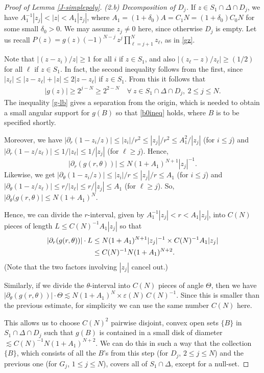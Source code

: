 \documentclass[11 pt]{amsart}
\theoremstyle{plain}
\numberwithin{equation}{section}
\theoremstyle{plain}
\numberwithin{equation}{section}
\theoremstyle{remark}
\begin{document}
\begin{proof}[Proof of Lemma \ref{J-simplepoly}]
\medskip
{\sl (2.b) Decomposition of $D_j$.}
If $z \in S_1 \cap \Delta \cap D_j$, we have $A_1^{-1} |z_j| < |z| < A_1 |z_j|$, where $A_1 = (1+\delta_0 ) A = C_1 N = (1+\delta_0 )C_0 N$ for some small $\delta_0 >0$. We may assume $z_j \not= 0$ here, since otherwise $D_j$ is empty.
Let us recall $P(z) = g(z) (-1)^{N-j}\, z^j \prod_{\ell=j+1}^N z_\ell$, as in \eqref{gz}.

Note that $|(z-z_i)/z| \ge 1$ for all $i$ if $z\in S_1$, and also $|(z_\ell - z)/z_\ell| \ge (1/2)$ for all $\ell$ if $z\in S_1$. In fact, the second inequality follows from the first, since $|z_\ell| \le |z- z_\ell| + |z| \le 2 |z- z_\ell|$ if $z \in S_1$. From this it follows that
\begin{align}\label{g-lb}
|g(z)| \ge 2^{j-N} \ge 2^{2-N} \quad \forall ~ z \in S_1 \cap \Delta \cap D_j, ~ 2\le j\le N .
\end{align}
The inequality \eqref{g-lb} gives a separation from the origin, which is needed to obtain a small angular support for $g(B)$ so that \eqref{b0ineq} holds, where $B$ is to be specified shortly.

Moreover, we have
$|\partial_r (1- z_i/z)| \le |z_i|/r^2 \le |z_j|/r^2 \le A_1^2 / |z_j|$ (for $i\le j$) and $|\partial_r (1- z/z_\ell)| \le 1/|z_\ell| \le 1/|z_j|$ (for $\ell \ge j$).
Hence,
\[ |\partial_r (g(r,\theta))| \le N(1+A_1)^{N+1} |z_j|^{-1} .
\]
Likewise, we get $|\partial_\theta (1- z_i/z)| \le |z_i|/r \le |z_j|/r \le A_1$ (for $i\le j$) and $|\partial_\theta (1- z/z_\ell)| \le r/|z_\ell| \le r/|z_j| \le A_1$ (for $\ell \ge j$).
So, $|\partial_\theta (g(r,\theta)| \le N(1+A_1 )^N$.

Hence, we can divide the $r$-interval, given by $A_1^{-1} |z_j| < r < A_1 |z_j|$, into $C(N)$ pieces of length $L \le C(N)^{-1} A_1 |z_j|$ so that
\begin{align}\label{partial-r}
|\partial_r (g(r,\theta))| \cdot L &\le N (1+A_1)^{N+1} |z_j|^{-1} \times C(N)^{-1} A_1 |z_j| \\
&\le C(N)^{-1} N (1+A_1)^{N+2} . \notag
\end{align}
(Note that the two factors involving $|z_j|$ cancel out.)

Similarly, if we divide the $\theta$-interval into $C(N)$ pieces of angle $\Theta$, then we have
$|\partial_\theta (g(r,\theta))| \cdot \Theta {\lesssim} N (1+A_1)^N \times {\varepsilon}(N)\, C(N)^{-1}$. Since this is smaller than the previous estimate, for simplicity we can use the same number $C(N)$ here.

This allows us to choose $C(N)^2$ pairwise disjoint, convex open sets $\{ B\}$ in $S_1 \cap \Delta \cap D_j$ such that $g(B)$ is contained in a small disk of diameter ${\lesssim} C(N)^{-1} N (1+A_1)^{N+2}$. We can do this in such a way that the collection $\{ B\}$, which consists of all the $B$'s from this step (for $D_j$, $2\le j\le N$) and the previous one (for $G_j$, $1\le j\le N$), covers all of $S_1\cap \Delta$, except for a null-set.


\end{proof}
\end{document}
